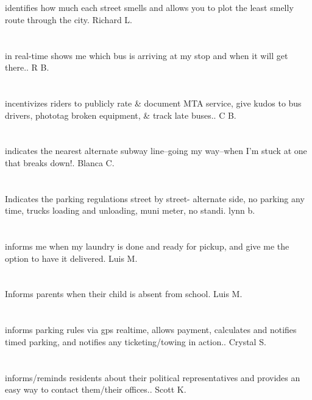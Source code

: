 \section{}identifies how much each street smells and allows you to plot the least smelly route through the city. Richard L.
\section{}in real-time shows me which bus is arriving at my stop and when it will get there.. R B.
\section{}incentivizes riders to publicly rate \& document MTA service,  give kudos to bus drivers,  phototag broken equipment,  \& track late buses.. C B.
\section{}indicates the nearest alternate subway line--going my way--when I'm stuck at one that breaks down!. Blanca C.
\section{}Indicates the parking regulations street by street- alternate side,  no parking any time,  trucks loading and unloading,  muni meter,  no standi. lynn b.
\section{}informs me when my laundry is done and ready for pickup,  and give me the option to have it delivered. Luis M.
\section{}Informs parents when their child is absent from school. Luis M.
\section{}informs parking rules via gps realtime,  allows payment,  calculates and notifies timed parking,  and notifies any ticketing/towing in action.. Crystal  S.
\section{}informs/reminds residents about their political representatives and provides an easy way to contact them/their offices.. Scott K.

